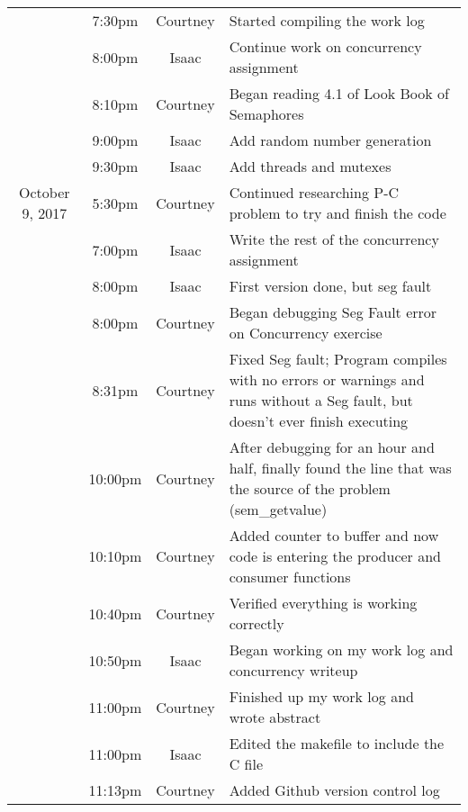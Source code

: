 \documentclass[letterpaper,10pt,draftclsnofoot,onecolumn,titlepage]{IEEEtran}
\begin{document}
\begin{center}
\begin{tabular}{ c c c l }
                 & 7:30pm & Courtney & Started compiling the work log \\
                 & 8:00pm & Isaac & Continue work on concurrency assignment \\
		 & 8:10pm & Courtney & Began reading 4.1 of Look Book of Semaphores \\ 
		 & 9:00pm & Isaac & Add random number generation \\
                 & 9:30pm & Isaac & Add threads and mutexes \\ \hline
 October 9, 2017 & 5:30pm & Courtney & Continued researching P-C problem to try and finish the code \\
 		 & 7:00pm & Isaac & Write the rest of the concurrency assignment \\
	         & 8:00pm & Isaac & First version done, but seg fault \\ 
		 & 8:00pm & Courtney & Began debugging Seg Fault error on Concurrency exercise \\
                 & 8:31pm & Courtney & Fixed Seg fault; Program compiles with no errors or warnings and runs without a Seg fault, but doesn't ever finish executing \\
                 & 10:00pm & Courtney & After debugging for an hour and half, finally found the line that was the source of the problem (sem\_getvalue) \\
                 & 10:10pm & Courtney & Added counter to buffer and now code is entering the producer and consumer functions \\
		 & 10:40pm & Courtney & Verified everything is working correctly \\
		 & 10:50pm & Isaac & Began working on my work log and concurrency writeup\\
		 & 11:00pm & Courtney & Finished up my work log and wrote abstract\\
		 & 11:00pm & Isaac & Edited the makefile to include the C file\\
		 & 11:13pm & Courtney & Added Github version control log\\ \hline
		 
                 
                 
\end{tabular}
\end{center}

%


	
\end{document}
